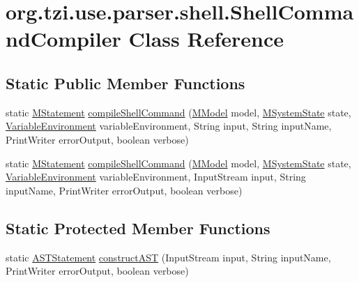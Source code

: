 \hypertarget{classorg_1_1tzi_1_1use_1_1parser_1_1shell_1_1_shell_command_compiler}{\section{org.\-tzi.\-use.\-parser.\-shell.\-Shell\-Command\-Compiler Class Reference}
\label{classorg_1_1tzi_1_1use_1_1parser_1_1shell_1_1_shell_command_compiler}
}
\subsection*{Static Public Member Functions}
\begin{DoxyCompactItemize}
\item 
static \hyperlink{classorg_1_1tzi_1_1use_1_1uml_1_1sys_1_1soil_1_1_m_statement}{M\-Statement} \hyperlink{classorg_1_1tzi_1_1use_1_1parser_1_1shell_1_1_shell_command_compiler_a0a9882b33afeb33b9c756adfaf7b40b7}{compile\-Shell\-Command} (\hyperlink{classorg_1_1tzi_1_1use_1_1uml_1_1mm_1_1_m_model}{M\-Model} model, \hyperlink{classorg_1_1tzi_1_1use_1_1uml_1_1sys_1_1_m_system_state}{M\-System\-State} state, \hyperlink{classorg_1_1tzi_1_1use_1_1util_1_1soil_1_1_variable_environment}{Variable\-Environment} variable\-Environment, String input, String input\-Name, Print\-Writer error\-Output, boolean verbose)
\item 
static \hyperlink{classorg_1_1tzi_1_1use_1_1uml_1_1sys_1_1soil_1_1_m_statement}{M\-Statement} \hyperlink{classorg_1_1tzi_1_1use_1_1parser_1_1shell_1_1_shell_command_compiler_a37fa766c6743181fbe8ecb9bb132cbf3}{compile\-Shell\-Command} (\hyperlink{classorg_1_1tzi_1_1use_1_1uml_1_1mm_1_1_m_model}{M\-Model} model, \hyperlink{classorg_1_1tzi_1_1use_1_1uml_1_1sys_1_1_m_system_state}{M\-System\-State} state, \hyperlink{classorg_1_1tzi_1_1use_1_1util_1_1soil_1_1_variable_environment}{Variable\-Environment} variable\-Environment, Input\-Stream input, String input\-Name, Print\-Writer error\-Output, boolean verbose)
\end{DoxyCompactItemize}
\subsection*{Static Protected Member Functions}
\begin{DoxyCompactItemize}
\item 
static \hyperlink{classorg_1_1tzi_1_1use_1_1parser_1_1soil_1_1ast_1_1_a_s_t_statement}{A\-S\-T\-Statement} \hyperlink{classorg_1_1tzi_1_1use_1_1parser_1_1shell_1_1_shell_command_compiler_a297fc2c71eb3d67e4719d263c824d841}{construct\-A\-S\-T} (Input\-Stream input, String input\-Name, Print\-Writer error\-Output, boolean verbose)
\end{DoxyCompactItemize}


